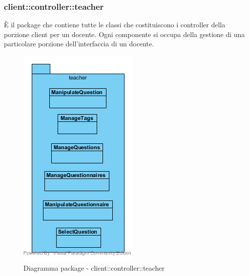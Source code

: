 \subsubsection{client::controller::teacher}
È il package che contiene tutte le classi che costituiscono i controller della porzione client per un docente. Ogni componente si occupa della gestione di una particolare porzione dell'interfaccia di un docente.\begin{center}
	\begin{figure}[H]
		\centering \includegraphics[scale=4, max width=\textwidth, max height=\myheight]{../img/diagrammiClassi/client/controller/teacher.png}
		\caption{Diagramma package - client::controller::teacher}
	\end{figure}
\end{center}


